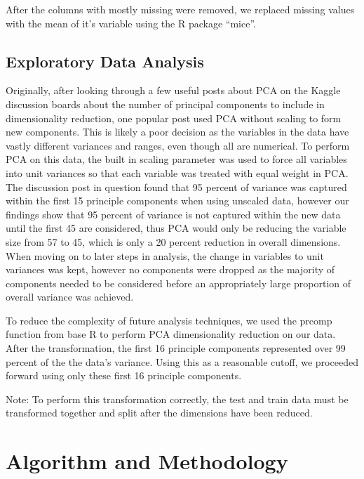 \documentclass[fleqn,10pt]{SelfArx} %
\begin{document}
After the columns with mostly missing were removed, we replaced missing values with the mean of it's variable using the R package ``mice''.
\subsection{Exploratory Data Analysis}

Originally, after looking through a few useful posts about PCA on the Kaggle discussion boards about the number of principal components to include in dimensionality reduction, one popular post used PCA without scaling to form new components. This is likely a poor decision as the variables in the data have vastly different variances and ranges, even though all are numerical. To perform PCA on this data, the built in scaling parameter was used to force all variables into unit variances so that each variable was treated with equal weight in PCA. The discussion post in question found that 95 percent of variance was captured within the first 15 principle components when using unscaled data, however our findings show that 95 percent of variance is not captured within the new data until the first 45 are considered, thus PCA would only be reducing the variable size from 57 to 45, which is only a 20 percent reduction in overall dimensions. When moving on to later steps in analysis, the change in variables to unit variances was kept, however no components were dropped as the majority of components needed to be considered before an appropriately large proportion of overall variance was achieved.

To reduce the complexity of future analysis techniques, we used the prcomp function from base R to perform PCA dimensionality reduction on our data. After the transformation, the first 16 principle components represented over 99 percent of the the data's variance. Using this as a reasonable cutoff, we proceeded forward using only these first 16 principle components.

Note: To perform this transformation correctly, the test and train data must be transformed together and split after the dimensions have been reduced.
\bigskip
\bigskip


\section{Algorithm and Methodology}
\end{document}
